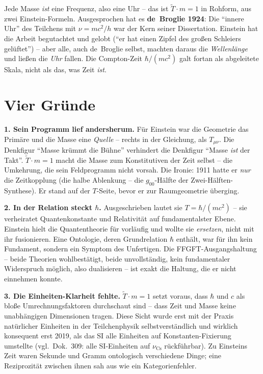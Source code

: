 Jede Masse \emph{ist} eine Frequenz, also eine Uhr -- das ist
$\tilde T \cdot m = 1$ in Rohform, aus zwei Einstein-Formeln.
Ausgesprochen hat es \textbf{de~Broglie 1924}: Die
\enquote{innere Uhr} des Teilchens mit $\nu = mc^2/h$ war der Kern
seiner Dissertation. Einstein hat die Arbeit begutachtet und
gelobt (\enquote{er hat einen Zipfel des großen Schleiers
gelüftet}) -- aber alle, auch de~Broglie selbst, machten daraus die
\emph{Wellenlänge} und ließen die \emph{Uhr} fallen. Die
Compton-Zeit $\hbar/(mc^2)$ galt fortan als abgeleitete Skala,
nicht als das, was Zeit \emph{ist}.

\section{Vier Gründe}

\textbf{1. Sein Programm lief andersherum.} Für Einstein war die
Geometrie das Primäre und die Masse eine \emph{Quelle} -- rechts in
der Gleichung, als $T_{\mu\nu}$. Die Denkfigur \enquote{Masse
krümmt die Bühne} verhindert die Denkfigur \enquote{Masse
\emph{ist} der Takt}. $\tilde T \cdot m = 1$ macht die Masse zum
Konstitutiven der Zeit selbst -- die Umkehrung, die sein
Feldprogramm nicht vorsah. Die Ironie: 1911 hatte er \emph{nur} die
Zeitkopplung (die halbe Ablenkung -- die $g_{00}$-Hälfte der
Zwei-Hälften-Synthese). Er stand auf der $T$-Seite, bevor er zur
Raumgeometrie überging.

\textbf{2. In der Relation steckt $\hbar$.} Ausgeschrieben lautet
sie $T = \hbar/(mc^2)$ -- sie verheiratet Quantenkonstante und
Relativität auf fundamentalster Ebene. Einstein hielt die
Quantentheorie für vorläufig und wollte sie \emph{ersetzen}, nicht
mit ihr fusionieren. Eine Ontologie, deren Grundrelation $\hbar$
enthält, war für ihn kein Fundament, sondern ein Symptom des
Unfertigen. Die FFGFT-Ausgangshaltung -- beide Theorien
wohlbestätigt, beide unvollständig, kein fundamentaler Widerspruch
möglich, also dualisieren -- ist exakt die Haltung, die er nicht
einnehmen konnte.

\textbf{3. Die Einheiten-Klarheit fehlte.} $\tilde T \cdot m = 1$
setzt voraus, dass $\hbar$ und $c$ als bloße Umrechnungsfaktoren
durchschaut sind -- dass Zeit und Masse keine unabhängigen
Dimensionen tragen. Diese Sicht wurde erst mit der Praxis
natürlicher Einheiten in der Teilchenphysik selbstverständlich und
wirklich konsequent erst 2019, als das SI alle Einheiten auf
Konstanten-Fixierung umstellte (vgl.\ Dok.~309: alle SI-Einheiten
auf $\nu_\text{Cs}$ rückführbar). Zu Einsteins Zeit waren Sekunde
und Gramm ontologisch verschiedene Dinge; eine Reziprozität
zwischen ihnen sah aus wie ein Kategorienfehler.

